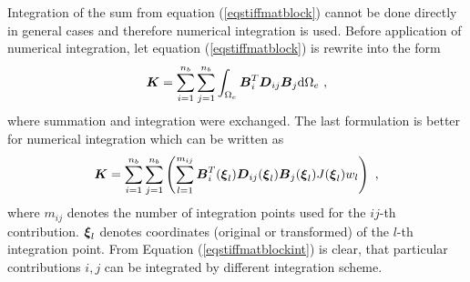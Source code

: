 Integration of the sum from equation (\ref{eqstiffmatblock}) cannot be done directly in general cases and therefore
numerical integration is used. Before application of numerical integration, let equation (\ref{eqstiffmatblock}) is
rewrite into the form
\begin{equation}\label{eqstiffmatblock2}
\mbox{\boldmath$K$} = \sum_{i=1}^{n_b} \sum_{j=1}^{n_b} \int_{\Omega_e} \mbox{\boldmath$B$}_i^T \mbox{\boldmath$D$}_{ij} \mbox{\boldmath$B$}_j {\rm d}\Omega_e\ ,
\end{equation}
where summation and integration were exchanged. The last formulation is better for numerical integration which can be
written as
\begin{equation}\label{eqstiffmatblockint}
\mbox{\boldmath$K$} = \sum_{i=1}^{n_b} \sum_{j=1}^{n_b} \left(\sum_{l=1}^{m_{ij}}
\mbox{\boldmath$B$}_i^T(\mbox{\boldmath$\xi$}_l) \mbox{\boldmath$D$}_{ij}(\mbox{\boldmath$\xi$}_l) \mbox{\boldmath$B$}_j(\mbox{\boldmath$\xi$}_l) J(\mbox{\boldmath$\xi$}_l) w_l\right)\ ,
\end{equation}
where $m_{ij}$ denotes the number of integration points used for the $ij$-th contribution. $\mbox{\boldmath$\xi$}_l$
denotes coordinates (original or transformed) of the $l$-th integration point. From Equation (\ref{eqstiffmatblockint})
is clear, that particular contributions $i,j$ can be integrated by different integration scheme.
